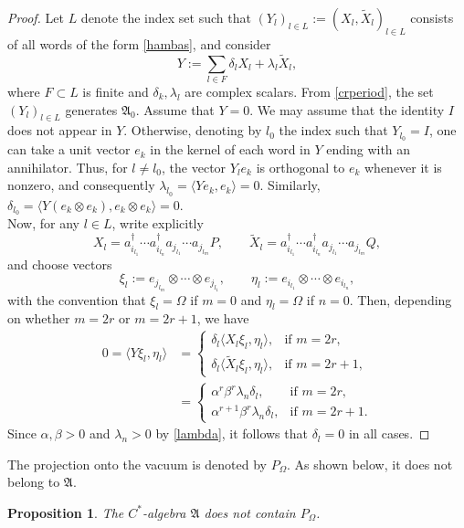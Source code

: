 \documentclass[12pt]{amsart}
\numberwithin{equation}{section}
\def\ga{{\mathfrak A}} \def\gpa{{\mathfrak a}}
\def\a{\alpha}
\def\b{\beta}
\def\d{\delta}  \def\D{\Delta}
\def\l{\lambda} \def\L{\Lambda}
\newtheorem{prop}[thm]{Proposition}
\theoremstyle{definition}
\begin{document}
\begin{proof}
Let $L$ denote the index set such that $(Y_l)_{l \in L}:=(X_l,\widetilde{X}_l)_{l \in L}$ consists of all words of the form \eqref{hambas}, and consider
\[
Y := \sum_{l \in F} \d_l X_l + \l_l \widetilde{X}_l,
\]
where $F \subset L$ is finite and $\d_k,\l_l$ are complex scalars. From \eqref{crperiod}, the set $(Y_l)_{l \in L}$ generates $\ga_0$. Assume that $Y=0$. We may assume that the identity $I$ does not appear in $Y$. Otherwise, denoting by $l_0$ the index such that $Y_{l_0}=I$, one can take a unit vector $e_k$ in the kernel of each word in $Y$ ending with an annihilator. Thus, for $l\neq l_0$, the vector $Y_l e_k$ is orthogonal to $e_k$ whenever it is nonzero, and consequently $\l_{l_0} = \langle Y e_k, e_k \rangle = 0$. Similarly, $\d_{l_0}=\langle Y (e_k\otimes e_k), e_k\otimes e_k \rangle = 0$. \\
Now, for any $l \in L$, write explicitly
\[
X_l = a^\dag_{i_{l_1}} \cdots a^\dag_{i_{l_n}} a_{j_{l_1}} \cdots a_{j_{l_m}} P, \qquad
\widetilde{X}_l = a^\dag_{i_{l_1}} \cdots a^\dag_{i_{l_n}} a_{j_{l_1}} \cdots a_{j_{l_m}} Q,
\]
and choose vectors
\[
\xi_l := e_{j_{l_m}} \otimes\cdots \otimes e_{j_{l_1}}, \qquad
\eta_l := e_{i_{l_1}} \otimes \cdots \otimes e_{i_{l_n}},
\]
with the convention that $\xi_l=\Omega$ if $m=0$ and $\eta_l=\Omega$ if $n=0$. Then, depending on whether $m = 2r$ or $m = 2r+1$, we have
\begin{align*}
0 = \langle Y \xi_l, \eta_l \rangle &=
\begin{cases}
\d_l \langle X_l \xi_l, \eta_l \rangle, & \text{if } m = 2r,\\
\d_l \langle \widetilde{X}_l \xi_l, \eta_l \rangle, & \text{if } m = 2r+1,
\end{cases}\\
&=
\begin{cases}
\a^r \b^r \l_n \d_l, & \text{if } m = 2r,\\
\a^{r+1} \b^r \l_n \d_l, & \text{if } m = 2r+1.
\end{cases}
\end{align*}
Since $\a,\b>0$ and $\l_n>0$ by \eqref{lambda}, it follows that $\d_l = 0$ in all cases.
\end{proof}
The projection onto the vacuum is denoted by $P_\Omega$. As shown below, it does not belong to $\ga$.
\begin{prop}\label{novacuum}
The $C^*$-algebra $\ga$ does not contain $P_\Omega$.
\end{prop}
\end{document}
